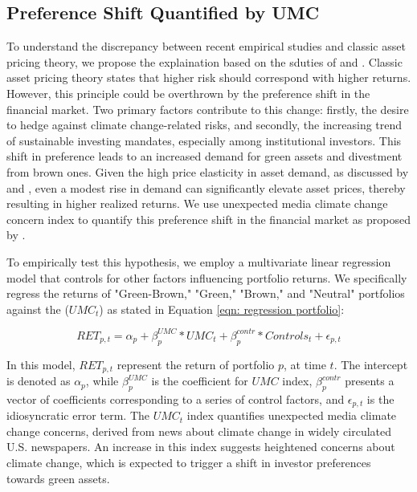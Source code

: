 \documentclass[12pt]{article}
\begin{document}
\subsection{Preference Shift Quantified by UMC}
\label{sec: explain contradiction}
To understand the discrepancy between recent empirical studies and classic asset pricing theory, we propose the explaination based on the sduties of \citet{koijen2019demand} and \citet{pastor2021sustainable}. Classic asset pricing theory states that higher risk should correspond with higher returns. However, this principle could be overthrown by the preference shift in the financial market. Two primary factors contribute to this change: firstly, the desire to hedge against climate change-related risks, and secondly, the increasing trend of sustainable investing mandates, especially among institutional investors. This shift in preference leads to an increased demand for green assets and divestment from brown ones. Given the high price elasticity in asset demand, as discussed by \citet{gabaix2021search} and \citet{hartzmark2022predictable}, even a modest rise in demand can significantly elevate asset prices, thereby resulting in higher realized returns. We use unexpected media climate change concern index to quantify this preference shift in the financial market as proposed by \citet{ardia2022climate}.

To empirically test this hypothesis, we employ a multivariate linear regression model that controls for other factors influencing portfolio returns. We specifically regress the returns of "Green-Brown," "Green," "Brown," and "Neutral" portfolios against the ($UMC_t$) as stated in Equation \ref{eqn: regression portfolio}:

\begin{equation}
\label{eqn: regression portfolio}
RET_{p, t} = \alpha_p + \beta^{UMC}_{p}*UMC_t + \beta^{contr}_p*Controls_t + \epsilon_{p, t}
\end{equation}

\noindent In this model, $RET_{p, t}$ represent the return of portfolio $p$, at time $t$. The intercept is denoted as $\alpha_p$, while $\beta^{UMC}_p$ is the coefficient for $UMC$ index, $\beta^{contr}_p$ presents a vector of coefficients corresponding to a series of control factors, and $\epsilon_{p, t}$ is the idiosyncratic error term. The $UMC_t$ index quantifies unexpected media climate change concerns, derived from news about climate change in widely circulated U.S. newspapers. An increase in this index suggests heightened concerns about climate change, which is expected to trigger a shift in investor preferences towards green assets.
\end{document}
